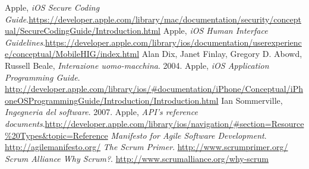 \documentclass[LaM,binding=0.6cm, oneside]{sapthesis}
\newcommand{\bs}{\textbackslash}
\begin{document}
% 
% 
% 
% 
% 

\backmatter

\begin{thebibliography}{}
 Apple, \emph{iOS Secure Coding Guide}.\newline \url{https://developer.apple.com/library/mac/documentation/security/conceptual/SecureCodingGuide/Introduction.html}
 Apple, \emph{iOS Human Interface Guidelines}.\newline \url{https://developer.apple.com/library/ios/documentation/userexperience/conceptual/MobileHIG/index.html}
 Alan Dix, Janet Finlay, Gregory D. Abowd, Russell Beale, \emph{Interazione uomo-macchina}. 2004.
 Apple, \emph{iOS Application Programming Guide}. \newline \url{http://developer.apple.com/library/ios/#documentation/iPhone/Conceptual/iPhoneOSProgrammingGuide/Introduction/Introduction.html}
 Ian Sommerville, \emph{Ingegneria del software}. 2007.
 Apple, \emph{API's reference documents}.\newline \url{http://developer.apple.com/library/ios/navigation/#section=Resource%20Types&topic=Reference}
\emph{Manifesto for Agile Software Development}. \url{ http://agilemanifesto.org/}
\emph{ The Scrum Primer}. \url{http://www.scrumprimer.org/}
 \emph{Scrum Alliance Why Scrum?}.  \url{http://www.scrumalliance.org/why-scrum}

\end{thebibliography}
\end{document}
